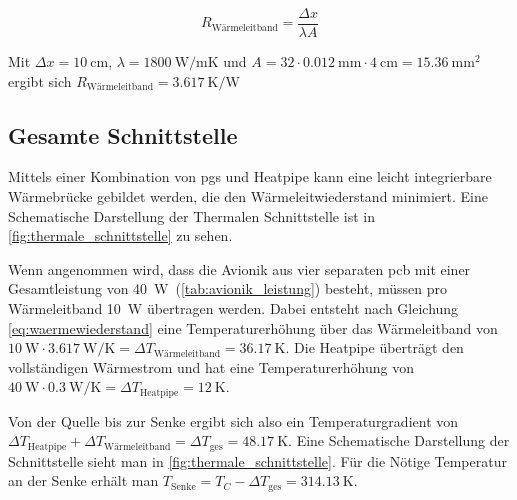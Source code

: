 \begin{equation*}
  R_\mathrm{Wärmeleitband} = \frac{\Delta x}{\lambda A}
\end{equation*}

Mit $\Delta x = \SI{10}{\centi\meter}$, $\lambda = \SI{1800}{\watt\per\meter\kelvin}$ und $A = 32 \cdot \SI{0,012}{\milli\meter} \cdot \SI{4}{\centi\meter} = \SI{15,36}{\milli\meter\squared}$
ergibt sich $R_\mathrm{Wärmeleitband} = \SI{3,617}{\kelvin\per\watt}$

\subsection{Gesamte Schnittstelle}

Mittels einer Kombination von \ac{pgs} und Heatpipe kann eine leicht integrierbare Wärmebrücke gebildet werden, die den Wärmeleitwiederstand
minimiert. Eine Schematische Darstellung der Thermalen Schnittstelle ist in \ref{fig:thermale_schnittstelle} zu sehen.

Wenn angenommen wird, dass die Avionik aus vier separaten \ac{pcb} mit einer Gesamtleistung von \SI{40}{\watt}~(\ref{tab:avionik_leistung}) besteht, müssen pro Wärmeleitband \SI{10}{\watt} übertragen werden.
Dabei entsteht nach Gleichung \ref{eq:waermewiederstand} eine Temperaturerhöhung über das Wärmeleitband von $\SI{10}{\watt} \cdot \SI{3,617}{\watt\per\kelvin} = \Delta T_\mathrm{Wärmeleitband} = \SI{36,17}{\kelvin}$.
Die Heatpipe überträgt den vollständigen Wärmestrom und hat eine Temperaturerhöhung von $\SI{40}{\watt} \cdot \SI{0,3}{\watt\per\kelvin} = \Delta T_\mathrm{Heatpipe} = \SI{12}{\kelvin}$.

Von der Quelle bis zur Senke ergibt sich also ein Temperaturgradient von $\Delta T_\mathrm{Heatpipe} + \Delta T_\mathrm{Wärmeleitband} = \Delta T_\mathrm{ges} = \SI{48,17}{\kelvin}$.
Eine Schematische Darstellung der Schnittstelle sieht man in \ref{fig:thermale_schnittstelle}. Für die Nötige Temperatur an der Senke
erhält man $T_\mathrm{Senke} = T_C - \Delta T_\mathrm{ges} = \SI{314,13}{\kelvin}$.

